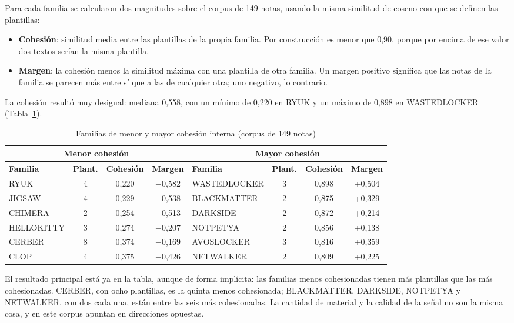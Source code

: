 Para cada familia se calcularon dos magnitudes sobre el corpus de 149 notas, usando la misma similitud de coseno con que se definen las plantillas:

\begin{itemize}
  \item \textbf{Cohesión}: similitud media entre las plantillas de la propia familia. Por construcción es menor que 0,90, porque por encima de ese valor dos textos serían la misma plantilla.
  \item \textbf{Margen}: la cohesión menos la similitud máxima con una plantilla de otra familia. Un margen positivo significa que las notas de la familia se parecen más entre sí que a las de cualquier otra; uno negativo, lo contrario.
\end{itemize}

La cohesión resultó muy desigual: mediana 0,558, con un mínimo de 0,220 en RYUK y un máximo de 0,898 en WASTEDLOCKER (Tabla~\ref{tab:cohesion_extremos}).

\begin{table}[ht]
\centering
\caption{Familias de menor y mayor cohesión interna (corpus de 149 notas)}
\label{tab:cohesion_extremos}
\begin{tabular}{|l|c|c|c||l|c|c|c|}
\hline
\multicolumn{4}{|c||}{\textbf{Menor cohesión}} & \multicolumn{4}{c|}{\textbf{Mayor cohesión}} \\
\hline
\textbf{Familia} & \textbf{Plant.} & \textbf{Cohesión} & \textbf{Margen} & \textbf{Familia} & \textbf{Plant.} & \textbf{Cohesión} & \textbf{Margen} \\
\hline
RYUK & 4 & 0,220 & $-$0,582 & WASTEDLOCKER & 3 & 0,898 & +0,504 \\
JIGSAW & 4 & 0,229 & $-$0,538 & BLACKMATTER & 2 & 0,875 & +0,329 \\
CHIMERA & 2 & 0,254 & $-$0,513 & DARKSIDE & 2 & 0,872 & +0,214 \\
HELLOKITTY & 3 & 0,274 & $-$0,207 & NOTPETYA & 2 & 0,856 & +0,138 \\
CERBER & 8 & 0,374 & $-$0,169 & AVOSLOCKER & 3 & 0,816 & +0,359 \\
CLOP & 4 & 0,375 & $-$0,426 & NETWALKER & 2 & 0,809 & +0,225 \\
\hline
\end{tabular}
\end{table}

El resultado principal está ya en la tabla, aunque de forma implícita: las familias menos cohesionadas tienen más plantillas que las más cohesionadas. CERBER, con ocho plantillas, es la quinta menos cohesionada; BLACKMATTER, DARKSIDE, NOTPETYA y NETWALKER, con dos cada una, están entre las seis más cohesionadas. La cantidad de material y la calidad de la señal no son la misma cosa, y en este corpus apuntan en direcciones opuestas.

